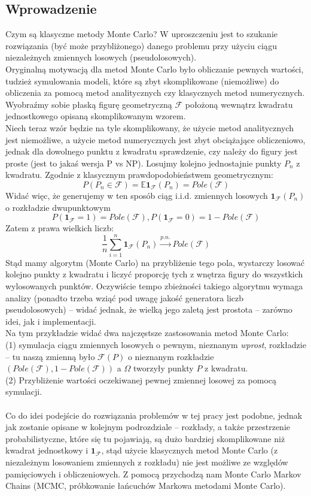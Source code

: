 \documentclass[a4paper]{article}
\begin{document}
\subsection{Wprowadzenie}
Czym są klasyczne metody Monte Carlo? W uproszczeniu jest to szukanie rozwiązania (być może przybliżonego) danego problemu przy użyciu ciągu niezależnych zmiennych losowych (pseudolosowych).\\
Oryginalną motywacją dla metod Monte Carlo było obliczanie pewnych wartości, tudzież symulowania modeli, które są zbyt skomplikowane (niemożliwe) do obliczenia za pomocą metod analitycznych czy klasycznych metod numerycznych. Wyobraźmy sobie płaską figurę geometryczną $\mathcal{F}$ położoną wewnątrz kwadratu jednostkowego opisaną skomplikowanym wzorem.\\
Niech teraz wzór będzie na tyle skomplikowany, że użycie metod analitycznych jest niemożliwe, a użycie metod numerycznych jest zbyt obciążające obliczeniowo, jednak dla dowolnego punktu z kwadratu sprawdzenie, czy należy do figury jest proste (jest to jakaś wersja P vs NP). Losujmy kolejno jednostajnie punkty $P_n$ z kwadratu. Zgodnie z klasycznym prawdopodobieństwem geometrycznym: $$P(P_n \in \mathcal{F}) = \mathbb{E}\mathbf{1}_{\mathcal{F}}(P_n) = Pole(\mathcal{F})$$
Widać więc, że generujemy w ten sposób ciąg i.i.d. zmiennych losowych $\mathbf{1}_{\mathcal{F}}(P_n)$ o rozkładzie dwupunktowym $$P(\mathbf{1}_{\mathcal{F}} = 1) = Pole(\mathcal{F}), P(\mathbf{1}_{\mathcal{F}} = 0) = 1 - Pole(\mathcal{F})$$
Zatem z prawa wielkich liczb:
$$\frac{1}{n} \sum\limits_{i=1}^n \mathbf{1}_{\mathcal{F}}(P_n) \overset{p.n.}{\to} Pole(\mathcal{F})$$
Stąd mamy algorytm (Monte Carlo) na przybliżenie tego pola, wystarczy losować kolejno punkty z kwadratu i liczyć proporcję tych z wnętrza figury do wszystkich wylosowanych punktów. Oczywiście tempo zbieżności takiego algorytmu wymaga analizy (ponadto trzeba wziąć pod uwagę jakość generatora liczb pseudolosowych) – widać jednak, że wielką jego zaletą jest prostota – zarówno idei, jak i implementacji.
\\
Na tym przykładzie widać dwa najczęstsze zastosowania metod Monte Carlo:\\
(1) symulacja ciągu zmiennych losowych o pewnym, nieznanym \textit{wprost}, rozkładzie – tu naszą zmienną było $\mathcal{F}(P)$ o nieznanym rozkładzie $(Pole(\mathcal{F}), 1 - Pole(\mathcal{F}))$ a $\Omega$ tworzyły punkty $P$ z kwadratu.\\
(2) Przybliżenie wartości oczekiwanej pewnej zmiennej losowej za pomocą symulacji.\\\\
Co do idei podejście do rozwiązania problemów w tej pracy jest podobne, jednak jak zostanie opisane w kolejnym podrozdziale – rozkłady, a także przestrzenie probabilistyczne, które się tu pojawiają, są dużo bardziej skomplikowane niż kwadrat jednostkowy i $\mathbf{1}_{\mathcal{F}}$, stąd użycie klasycznych metod Monte Carlo (z niezależnym losowaniem zmiennych z rozkładu) nie jest możliwe ze względów pamięciowych i obliczeniowych. Z pomocą przychodzą nam Monte Carlo Markov Chains (MCMC, próbkowanie łańcuchów Markowa metodami Monte Carlo).
\\\\
\end{document}
